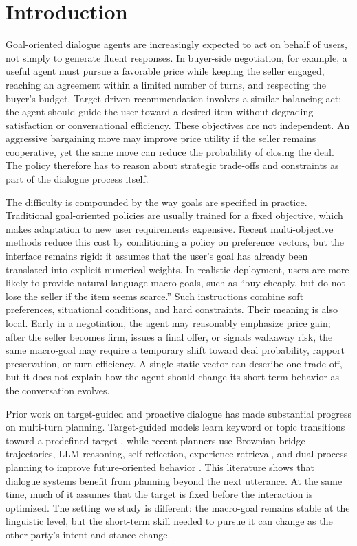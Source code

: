 \section{Introduction}

Goal-oriented dialogue agents are increasingly expected to act on behalf of
users, not simply to generate fluent responses. In buyer-side negotiation, for
example, a useful agent must pursue a favorable price while keeping the seller
engaged, reaching an agreement within a limited number of turns, and respecting
the buyer's budget. Target-driven recommendation involves a similar balancing
act: the agent should guide the user toward a desired item without degrading
satisfaction or conversational efficiency. These objectives are not independent.
An aggressive bargaining move may improve price utility if the seller remains
cooperative, yet the same move can reduce the probability of closing the deal.
The policy therefore has to reason about strategic trade-offs and constraints
as part of the dialogue process itself.

The difficulty is compounded by the way goals are specified in practice.
Traditional goal-oriented policies are usually trained for a fixed objective,
which makes adaptation to new user requirements expensive. Recent
multi-objective methods reduce this cost by conditioning a policy on preference
vectors, but the interface remains rigid: it assumes that the user's goal has
already been translated into explicit numerical weights. In realistic
deployment, users are more likely to provide natural-language macro-goals, such
as ``buy cheaply, but do not lose the seller if the item seems scarce.'' Such
instructions combine soft preferences, situational conditions, and hard
constraints. Their meaning is also local. Early in a negotiation, the agent may
reasonably emphasize price gain; after the seller becomes firm, issues a final
offer, or signals walkaway risk, the same macro-goal may require a temporary
shift toward deal probability, rapport preservation, or turn efficiency. A
single static vector can describe one trade-off, but it does not explain how
the agent should change its short-term behavior as the conversation evolves.

Prior work on target-guided and proactive dialogue has made substantial
progress on multi-turn planning. Target-guided models learn keyword or topic
transitions toward a predefined target
\cite{tang-etal-2019-target,qin2020dynamic,zhong2021keyword,kishinami-etal-2022-target,yang-etal-2022-topkg},
while recent planners use Brownian-bridge trajectories, LLM reasoning,
self-reflection, experience retrieval, and dual-process planning to improve
future-oriented behavior
\cite{wang-etal-2023-dialogue,zheng-etal-2024-thoughts,guo-etal-2024-pcqpr,dao-etal-2024-experience,he2024planning}.
This literature shows that dialogue systems benefit from planning beyond the
next utterance. At the same time, much of it assumes that the target is fixed
before the interaction is optimized. The setting we study is different: the
macro-goal remains stable at the linguistic level, but the short-term skill
needed to pursue it can change as the other party's intent and stance change.

